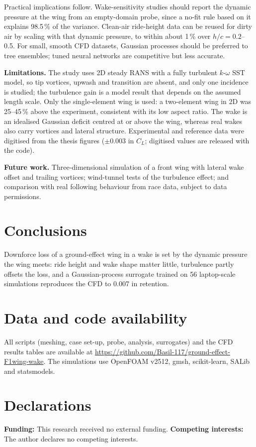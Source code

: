 \documentclass[11pt,a4paper]{article}
\begin{document}
Practical implications follow. Wake-sensitivity studies should report the dynamic pressure at the wing from an empty-domain probe, since a no-fit rule based on it explains 98.5\,\% of the variance. Clean-air ride-height data can be reused for dirty air by scaling with that dynamic pressure, to within about 1\,\% over $h/c = 0.2$--0.5. For small, smooth CFD datasets, Gaussian processes should be preferred to tree ensembles; tuned neural networks are competitive but less accurate.

\textbf{Limitations.} The study uses 2D steady RANS with a fully turbulent $k$-$\omega$ SST model, so tip vortices, upwash and transition are absent, and only one incidence is studied; the turbulence gain is a model result that depends on the assumed length scale. Only the single-element wing is used: a two-element wing in 2D was 25--45\,\% above the experiment, consistent with its low aspect ratio. The wake is an idealised Gaussian deficit centred at or above the wing, whereas real wakes also carry vortices and lateral structure. Experimental and reference data were digitised from the thesis figures ($\pm0.003$ in $C_L$; digitised values are released with the code).

\textbf{Future work.} Three-dimensional simulation of a front wing with lateral wake offset and trailing vortices; wind-tunnel tests of the turbulence effect; and comparison with real following behaviour from race data, subject to data permissions.

\section{Conclusions}
Downforce loss of a ground-effect wing in a wake is set by the dynamic pressure the wing meets: ride height and wake shape matter little, turbulence partly offsets the loss, and a Gaussian-process surrogate trained on 56 laptop-scale simulations reproduces the CFD to 0.007 in retention.

\section*{Data and code availability}
All scripts (meshing, case set-up, probe, analysis, surrogates) and the CFD results tables are available at \url{https://github.com/Basil-117/ground-effect-F1wing-wake}. The simulations use OpenFOAM v2512, gmsh, scikit-learn, SALib and statsmodels.

\section*{Declarations}
\textbf{Funding:} This research received no external funding. \textbf{Competing interests:} The author declares no competing interests.
\end{document}
